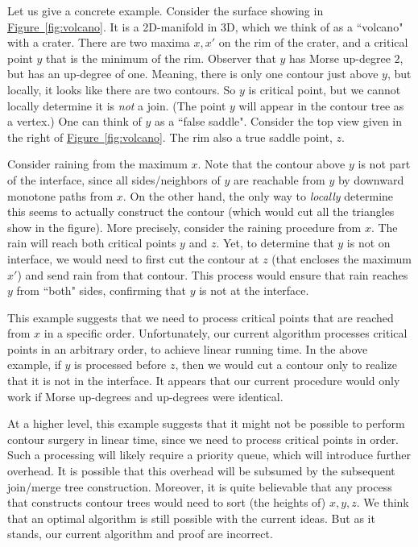 \documentclass[11pt]{article}
\theoremstyle{definition}
\newcommand{\Fig}[1]{\hyperref[fig:#1]{Figure~\ref*{fig:#1}}} %
\begin{document}
Let us give a concrete example. Consider the surface showing in \Fig{volcano}. It is a 2D-manifold
in 3D, which we think of as a ``volcano" with a crater. There are two maxima $x, x'$ on the rim of the
crater, and a critical point $y$ that is the minimum of the rim. Observer that $y$ 
has Morse up-degree $2$, but has an up-degree of one. Meaning, there is only one contour just above $y$, but locally, it looks like
there are two contours. So $y$ is critical point, but we cannot locally determine it is \emph{not} a join. (The point $y$
will appear in the contour tree as a vertex.) One can think of $y$ as a ``false saddle". Consider the top view given in the right of \Fig{volcano}. The rim 
also a true saddle point, $z$.

Consider raining from the maximum $x$. Note that the contour above $y$ is not part of the interface, since all sides/neighbors of $y$ are reachable
from $y$ by downward monotone paths from $x$. On the other hand, the only way to \emph{locally} determine this seems to actually construct
the contour (which would cut all the triangles show in the figure). More precisely, consider the raining procedure from $x$. The rain
will reach both critical points $y$ and $z$. Yet, to determine that $y$ is not on interface, we would need to first cut the contour
at $z$ (that encloses the maximum $x'$) and send rain from that contour. This process would ensure that rain reaches $y$ from ``both" sides,
confirming that $y$ is not at the interface. 

This example suggests that we need to process critical points that are reached from $x$ in a specific order. Unfortunately,
our current algorithm processes critical points in an arbitrary order, to achieve linear running time. In the above example,
if $y$ is processed before $z$, then we would cut a contour only to realize that it is not in the interface. It appears
that our current procedure would only work if Morse up-degrees and up-degrees were identical.

At a higher level, this example suggests that it might not be possible to perform contour surgery in linear time,
since we need to process critical points in order. Such a processing will likely require a priority queue, which
will introduce further overhead. It is possible that this overhead will be subsumed by the subsequent join/merge
tree construction. Moreover, it is quite believable that any process that constructs contour trees
would need to sort (the heights of) $x, y, z$. We think that an optimal algorithm is still possible
with the current ideas. But as it stands, our current algorithm and proof are incorrect.
\end{document}
